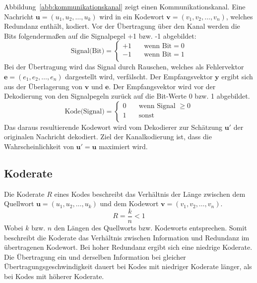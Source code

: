 Abbildung~\ref{abb:kommunikationskanal} zeigt einen Kommunikationskanal. Eine Nachricht $\mathbf{u}=\left( u_{1},u_{2},\dots ,u_{k}\right)$ wird in ein Kodewort $\mathbf{v}=\left( v_{1},v_{2},\dots ,v_{n}\right)$, welches Redundanz enthält, kodiert. Vor der Übertragung über den Kanal werden die Bits folgendermaßen auf die Signalpegel +1 bzw. -1 abgebildet:
\begin{equation}
\text{Signal(Bit)} =
\begin{cases}
  +1  & \quad \text{wenn Bit} = 0\\
  -1  & \quad \text{wenn Bit} = 1\\
\end{cases}
\label{eq:bit_zu_signal_abbildung}
\end{equation}
Bei der Übertragung wird das Signal durch Rauschen, welches als Fehlervektor $\mathbf{e}=\left( e_{1},e_{2},\dots ,e_{n}\right)$ dargestellt wird, verfälscht. Der Empfangsvektor $\mathbf{y}$ ergibt sich aus der Überlagerung von $\mathbf{v}$ und $\mathbf{e}$. Der Empfangsvektor wird vor der Dekodierung von den Signalpegeln zurück auf die Bit-Werte 0 bzw. 1 abgebildet.
\begin{equation}
\text{Kode(Signal)} =
\begin{cases}
  0  & \quad \text{wenn Signal } \geq 0\\
  1  & \quad \text{sonst}\\
\end{cases}
\label{eq:signal_zu_bit_abbildung}
\end{equation}
Das daraus resultierende Kodewort wird vom Dekodierer zur Schätzung $\mathbf{u'}$ der originalen Nachricht dekodiert. Ziel der Kanalkodierung ist, dass die Wahrscheinlichkeit von $\mathbf{u'}=\mathbf{u}$ maximiert wird.

\subsection{Koderate}
\label{kapitel:grundlagen_koderate}
Die Koderate $R$ eines Kodes beschreibt das Verhältnis der Länge zwischen dem Quellwort $\mathbf{u}=\left( u_{1},u_{2},\dots ,u_{k}\right)$ und dem Kodewort $\mathbf{v}=\left( v_{1},v_{2},\dots ,v_{n}\right)$.
\begin{equation}
R=\frac{k}{n}<1
\end{equation}
Wobei $k$ bzw. $n$ den Längen des Quellworts bzw. Kodeworts entsprechen. Somit beschreibt die Koderate das Verhältnis zwischen Information und Redundanz im übertragenen Kodewort. Bei hoher Redundanz ergibt sich eine niedrige Koderate. Die Übertragung ein und derselben Information bei gleicher Übertragungsgeschwindigkeit dauert bei Kodes mit niedriger Koderate länger, als bei Kodes mit höherer Koderate.
\pagebreak
